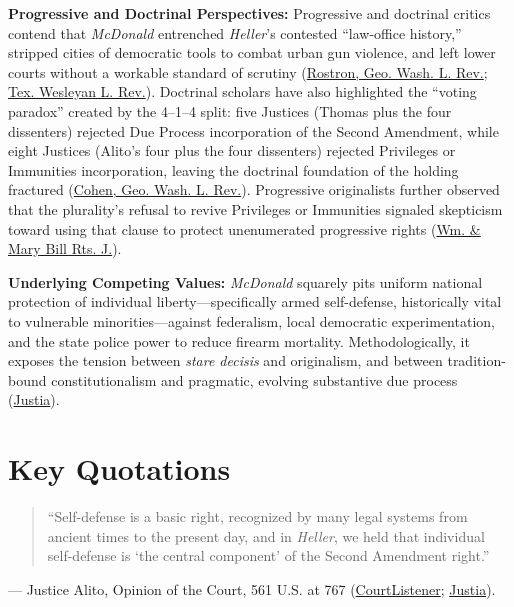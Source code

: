 \documentclass[12pt]{article}
\begin{document}
\textbf{Progressive and Doctrinal Perspectives:} Progressive and doctrinal critics contend that \textit{McDonald} entrenched \textit{Heller}'s contested ``law-office history,'' stripped cities of democratic tools to combat urban gun violence, and left lower courts without a workable standard of scrutiny (\href{https://irlaw.umkc.edu/faculty_works/671/}{Rostron, Geo. Wash. L. Rev.}; \href{https://scholarship.law.tamu.edu/context/txwes-lr/article/1481/viewcontent/10.37419_3ATWLR.V19.I3.3.pdf}{Tex. Wesleyan L. Rev.}). Doctrinal scholars have also highlighted the ``voting paradox'' created by the 4--1--4 split: five Justices (Thomas plus the four dissenters) rejected Due Process incorporation of the Second Amendment, while eight Justices (Alito's four plus the four dissenters) rejected Privileges or Immunities incorporation, leaving the doctrinal foundation of the holding fractured (\href{https://www.gwlr.org/wp-content/uploads/2012/08/79-3-Cohen.pdf}{Cohen, Geo. Wash. L. Rev.}). Progressive originalists further observed that the plurality's refusal to revive Privileges or Immunities signaled skepticism toward using that clause to protect unenumerated progressive rights (\href{https://scholarship.law.wm.edu/cgi/viewcontent.cgi?article=1567&context=wmborj}{Wm. \& Mary Bill Rts. J.}).

\textbf{Underlying Competing Values:} \textit{McDonald} squarely pits uniform national protection of individual liberty---specifically armed self-defense, historically vital to vulnerable minorities---against federalism, local democratic experimentation, and the state police power to reduce firearm mortality. Methodologically, it exposes the tension between \textit{stare decisis} and originalism, and between tradition-bound constitutionalism and pragmatic, evolving substantive due process (\href{https://supreme.justia.com/cases/federal/us/561/742/}{Justia}).

\section{Key Quotations}

\begin{quote}
``Self-defense is a basic right, recognized by many legal systems from ancient times to the present day, and in \textit{Heller}, we held that individual self-defense is `the central component' of the Second Amendment right.''
\end{quote}
\noindent --- Justice Alito, Opinion of the Court, 561 U.S. at 767 (\href{https://www.courtlistener.com/opinion/149702/mcdonald-v-city-of-chicago/}{CourtListener}; \href{https://supreme.justia.com/cases/federal/us/561/742/}{Justia}).
\end{document}
